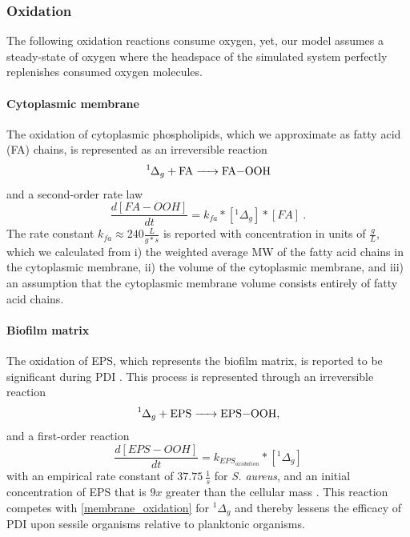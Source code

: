 \subsubsection{Oxidation}
The following oxidation reactions consume oxygen, yet, our model assumes a steady-state of oxygen where the headspace of the simulated system perfectly replenishes consumed oxygen molecules.

\paragraph{Cytoplasmic membrane} 
The oxidation of cytoplasmic phospholipids, which we approximate as fatty acid (FA) chains, is represented as an irreversible reaction \cite{Watabe2007OxidationMembranes.}
\begin{equation} \label{membrane_oxidation}
    \ce{^1\Delta_g + FA -> FA-OOH}
\end{equation}
and a second-order rate law
\begin{equation} \label{membrane_oxidation_kinetics}
    \frac{d[FA-OOH]}{dt} = k_{fa}*[^1\Delta_g]*[FA]~.
\end{equation}
The rate constant $k_{fa} \approx 240 \frac{L}{g*s}$ \cite{Mukai2019KineticSolution} is reported with concentration in units of $\frac{g}{L}$, which we calculated from i) the weighted average MW of the fatty acid chains in the cytoplasmic membrane, ii) the volume of the cytoplasmic membrane, and iii) an assumption that the cytoplasmic membrane volume consists entirely of fatty acid chains. 

\paragraph{Biofilm matrix} 
The oxidation of EPS, which represents the biofilm matrix, is reported to be significant during PDI \cite{Beirao2014PhotodynamicPorphyrin}. This process is represented through an irreversible reaction
\begin{equation} \label{EPS_oxidation}
    \ce{^1\Delta_g + EPS -> EPS-OOH},
\end{equation}
and a first-order reaction
\begin{equation} \label{EPS_oxidation_kinetics}
    \frac{d[EPS-OOH]}{dt} = k_{EPS_{oxidation}}*[^1\Delta_g]
\end{equation}
with an empirical rate constant of $37.75~\frac{1}{s}$ for \textit{S. aureus}, and an initial concentration of EPS that is $9x$ greater than the cellular mass \cite{Flemming2010TheMatrix}.
This reaction competes with \cref{membrane_oxidation} for $^1\Delta_g$ and thereby lessens the efficacy of PDI upon sessile organisms relative to planktonic organisms. 

